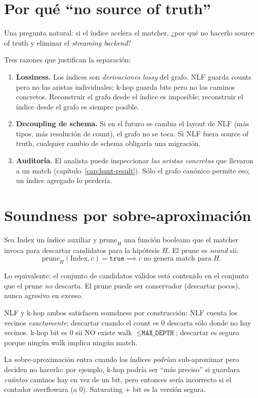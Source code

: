 \section{Por qué ``no source of truth''}

Una pregunta natural: si el índice acelera el matcher, ¿por qué no
hacerlo source of truth y eliminar el \emph{streaming backend}?

Tres razones que justifican la separación:

\begin{enumerate}
    \item \textbf{Lossiness.} Los índices son \emph{derivaciones
    lossy} del grafo. NLF guarda counts pero no las aristas
    individuales; k-hop guarda bits pero no los caminos concretos.
    Reconstruir el grafo desde el índice es imposible; reconstruir
    el índice desde el grafo es siempre posible.
    \item \textbf{Decoupling de schema.} Si en el futuro se cambia
    el layout de NLF (más tipos, más resolución de count), el grafo
    no se toca. Si NLF fuera source of truth, cualquier cambio de
    schema obligaría una migración.
    \item \textbf{Auditoría.} El analista puede inspeccionar
    \emph{las aristas concretas} que llevaron a un match
    (capítulo~\ref{cap:hunt-result}). Sólo el grafo canónico
    permite eso; un índice agregado lo perdería.
\end{enumerate}

\section{Soundness por sobre-aproximación}

\begin{definition}
Sea \(\mathrm{Index}\) un índice auxiliar y \(\mathrm{prune}_{H}\)
una función booleana que el matcher invoca para descartar
candidatos para la hipótesis \(H\). El prune es \emph{sound} sii:
\[
\mathrm{prune}_H(\mathrm{Index}, c) = \texttt{true} \implies c\;\text{no genera match para}\;H.
\]
\end{definition}

\noindent
Lo equivalente: el conjunto de candidatos válidos está contenido
en el conjunto que el prune \emph{no} descarta. El prune puede
ser conservador (descartar pocos), nunca agresivo en exceso.

\begin{nota}
NLF y k-hop ambos satisfacen soundness por construcción: NLF cuenta
los vecinos \emph{exactamente}; descartar cuando el count es 0
descarta sólo donde no hay vecinos. k-hop bit es 0 sii NO existe
walk \(\leq \texttt{MAX\_DEPTH}\); descartar es seguro porque ningún
walk implica ningún match.

La sobre-aproximación entra cuando los índices \emph{podrían}
sub-aproximar pero deciden no hacerlo: por ejemplo, k-hop podría
ser ``más preciso'' si guardara \emph{cuántos} caminos hay en vez
de un bit, pero entonces sería incorrecto si el contador
overflowara (a 0). Saturating + bit es la versión segura.
\end{nota}

